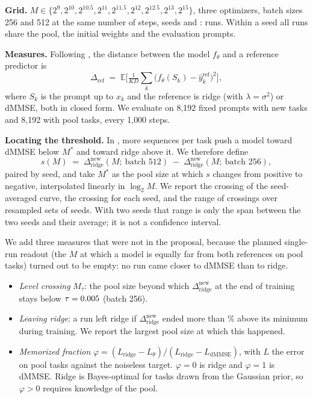 \documentclass[11pt]{article}
\newcommand{\Mstar}{M^{*}}
\newcommand{\dridge}{\Delta_{\mathrm{ridge}}}
\begin{document}
\textbf{Grid.} $M \in \{2^{9}, 2^{10}, 2^{10.5}, 2^{11}, 2^{11.5}, 2^{12}, 2^{12.5}, 2^{13}, 2^{15}\}$, three optimizers, batch sizes 256 and 512 at the same number of steps, seeds \SeedA{} and \SeedB{}: \NRuns{} runs. Within a seed all runs share the pool, the initial weights and the evaluation prompts.

\textbf{Measures.} Following \citet{raventos2023}, the distance between the model $f_\theta$ and a reference predictor is
\[
\Delta_{\mathrm{ref}} \;=\; \mathbb{E}\Big[\tfrac{1}{KD} \textstyle\sum_{k} \big(f_\theta(S_k) - \hat{y}^{\mathrm{ref}}_k\big)^2\Big],
\]
where $S_k$ is the prompt up to $x_k$ and the reference is ridge (with $\lambda = \sigma^2$) or dMMSE, both in closed form. We evaluate on 8{,}192 fixed prompts with new tasks and 8{,}192 with pool tasks, every 1{,}000 steps.

\textbf{Locating the threshold.} In \citet{raventos2023}, more sequences per task push a model toward dMMSE below $\Mstar$ and toward ridge above it. We therefore define
\[
s(M) \;=\; \dridge^{\mathrm{new}}(M;\ \text{batch } 512) \;-\; \dridge^{\mathrm{new}}(M;\ \text{batch } 256),
\]
paired by seed, and take $\Mstar$ as the pool size at which $s$ changes from positive to negative, interpolated linearly in $\log_2 M$. We report the crossing of the seed-averaged curve, the crossing for each seed, and the range of crossings over resampled sets of seeds. With two seeds that range is only the span between the two seeds and their average; it is not a confidence interval.

We add three measures that were not in the proposal, because the planned single-run readout (the $M$ at which a model is equally far from both references on pool tasks) turned out to be empty: no run came closer to dMMSE than to ridge.
\begin{itemize}\setlength{\itemsep}{0pt}
\item \emph{Level crossing} $M_\tau$: the pool size beyond which $\dridge^{\mathrm{new}}$ at the end of training stays below $\tau = 0.005$ (batch 256).
\item \emph{Leaving ridge}: a run left ridge if $\dridge^{\mathrm{new}}$ ended more than \ReboundPct\% above its minimum during training. We report the largest pool size at which this happened.
\item \emph{Memorized fraction} $\varphi = (L_{\mathrm{ridge}} - L_{\theta}) / (L_{\mathrm{ridge}} - L_{\mathrm{dMMSE}})$, with $L$ the error on pool tasks against the noiseless target. $\varphi = 0$ is ridge and $\varphi = 1$ is dMMSE. Ridge is Bayes-optimal for tasks drawn from the Gaussian prior, so $\varphi > 0$ requires knowledge of the pool.
\end{itemize}
\end{document}
